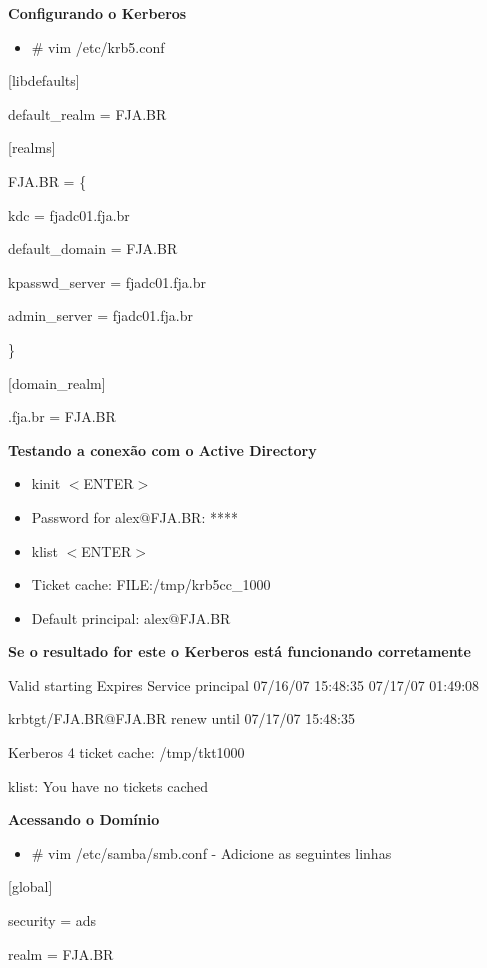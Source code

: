 \textbf{Configurando o Kerberos}

\begin{itemize}
	\item {\# vim /etc/krb5.conf}
\end{itemize}

[libdefaults]

	default\_realm = FJA.BR

[realms]

    FJA.BR = \{

      kdc = fjadc01.fja.br

      default\_domain = FJA.BR

      kpasswd\_server = fjadc01.fja.br

      admin\_server = fjadc01.fja.br

     \}

[domain\_realm]

.fja.br = FJA.BR

\textbf {Testando a conexão com o Active Directory}

\begin{itemize}
	\item {kinit $<$ENTER$>$}
	\item {Password for alex$@$FJA.BR: ****}
	\item {klist $<$ENTER$>$}
	\item {Ticket cache: FILE:/tmp/krb5cc\_1000}
	\item {Default principal: alex$@$FJA.BR}
\end{itemize}

\textbf {Se o resultado for este o Kerberos está funcionando corretamente}

	Valid starting Expires Service principal 07/16/07 15:48:35  07/17/07 01:49:08  

	krbtgt/FJA.BR@FJA.BR renew until 07/17/07 15:48:35
	
	Kerberos 4 ticket cache: /tmp/tkt1000
	
	klist: You have no tickets cached

\textbf{Acessando o Domínio}

\begin{itemize}
	\item {\# vim /etc/samba/smb.conf} -  Adicione as seguintes linhas
\end{itemize}

[global]

        security = ads

        realm = FJA.BR

